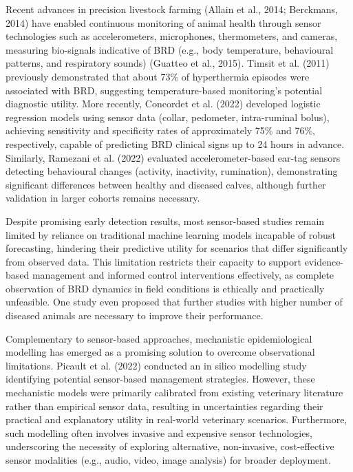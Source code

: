 Recent advances in precision livestock farming (Allain et al., 2014; Berckmans, 2014) have enabled continuous monitoring of animal health through sensor technologies such as accelerometers, microphones, thermometers, and cameras, measuring bio-signals indicative of BRD (e.g., body temperature, behavioural patterns, and respiratory sounds) (Guatteo et al., 2015). Timsit et al. (2011) previously demonstrated that about 73\% of hyperthermia episodes were associated with BRD, suggesting temperature-based monitoring's potential diagnostic utility. More recently, Concordet et al. (2022) developed logistic regression models using sensor data (collar, pedometer, intra-ruminal bolus), achieving sensitivity and specificity rates of approximately 75\% and 76\%, respectively, capable of predicting BRD clinical signs up to 24 hours in advance. Similarly, Ramezani et al. (2022) evaluated accelerometer-based ear-tag sensors detecting behavioural changes (activity, inactivity, rumination), demonstrating significant differences between healthy and diseased calves, although further validation in larger cohorts remains necessary.

Despite promising early detection results, most sensor-based studies remain limited by reliance on traditional machine learning models incapable of robust forecasting, hindering their predictive utility for scenarios that differ significantly from observed data. This limitation restricts their capacity to support evidence-based management and informed control interventions effectively, as complete observation of BRD dynamics in field conditions is ethically and practically unfeasible. One study even proposed that further studies with higher number of diseased animals are necessary to improve their performance. 

Complementary to sensor-based approaches, mechanistic epidemiological modelling has emerged as a promising solution to overcome observational limitations. Picault et al. (2022) conducted an in silico modelling study identifying potential sensor-based management strategies. However, these mechanistic models were primarily calibrated from existing veterinary literature rather than empirical sensor data, resulting in uncertainties regarding their practical and explanatory utility in real-world veterinary scenarios. Furthermore, such modelling often involves invasive and expensive sensor technologies, underscoring the necessity of exploring alternative, non-invasive, cost-effective sensor modalities (e.g., audio, video, image analysis) for broader deployment.

